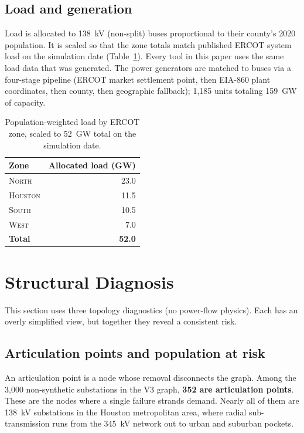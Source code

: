 \documentclass[12pt,letterpaper]{article}
\begin{document}
\subsection{Load and generation}

Load is allocated to 138~kV (non-split) buses proportional to their county's 2020 population. It is scaled so that the zone totals match published ERCOT system load on the simulation date (Table~\ref{tab:zone_loads}). Every tool in this paper uses the same load data that was generated. The power generators are matched to buses via a four-stage pipeline (ERCOT market settlement point, then EIA-860 plant coordinates, then county, then geographic fallback); 1{,}185 units totaling 159~GW of capacity.

\begin{table}[h]
\centering
\caption{Population-weighted load by ERCOT zone, scaled to 52~GW total on the simulation date.}
\label{tab:zone_loads}
\begin{tabular}{@{}lr@{}}
\toprule
\textbf{Zone} & \textbf{Allocated load (GW)} \\
\midrule
\textsc{North}   & 23.0 \\
\textsc{Houston} & 11.5 \\
\textsc{South}   & 10.5 \\
\textsc{West}    & 7.0 \\
\midrule
\textbf{Total}   & \textbf{52.0} \\
\bottomrule
\end{tabular}
\end{table}

\section{Structural Diagnosis}
\label{sec:structural}

This section uses three topology diagnostics (no power-flow physics). Each has an overly simplified view, but together they reveal a consistent risk.

\subsection{Articulation points and population at risk}

An articulation point is a node whose removal disconnects the graph. Among the 3{,}000 non-synthetic substations in the V3 graph, \textbf{352 are articulation points}. These are the nodes where a single failure strands demand. Nearly all of them are 138~kV substations in the Houston metropolitan area, where radial sub-transmission runs from the 345~kV network out to urban and suburban pockets.
\end{document}
